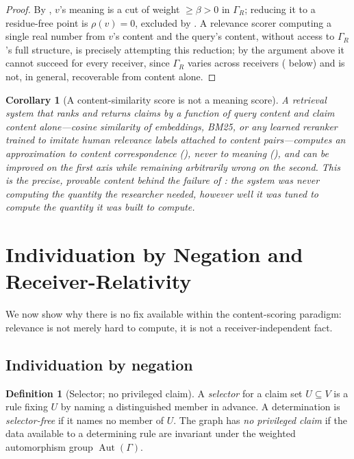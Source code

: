 \documentclass[11pt,twocolumn,a4paper]{article}
\theoremstyle{frathm}
\newtheorem{corollary}[theorem]{Corollary}
\theoremstyle{definition}
\newtheorem{definition}[theorem]{Definition}
\theoremstyle{remark}
\newcommand{\Gph}{\Gamma}
\newcommand{\V}{V}
\newcommand{\flo}{\beta}
\newcommand{\res}{\rho}
\DeclareMathOperator{\Aut}{Aut}
\begin{document}
\begin{proof}
By , $v$'s meaning is a cut of weight $\ge\flo>0$ in
$\Gph_R$; reducing it to a residue-free point is $\res(v)=0$, excluded by
. A relevance scorer computing a single real
number from $v$'s content and the query's content, without access to
$\Gph_R$'s full structure, is precisely attempting this reduction; by the
argument above it cannot succeed for every receiver, since $\Gph_R$
varies across receivers ( below) and is not, in
general, recoverable from content alone.
\end{proof}

\begin{corollary}[A content-similarity score is not a meaning score]
\label{cor:not-meaning-score}
A retrieval system that ranks and returns claims by a function of query
content and claim content alone---cosine similarity of embeddings, BM25,
or any learned reranker trained to imitate human relevance labels
attached to content pairs---computes an approximation to content
correspondence (), never to meaning
(), and can be improved on the first axis while
remaining arbitrarily wrong on the second. This is the precise, provable
content behind the failure of : the system was never
computing the quantity the researcher needed, however well it was tuned
to compute the quantity it was built to compute.
\end{corollary}

\section{Individuation by Negation and Receiver-Relativity}
\label{sec:individuation}

We now show why there is no fix available within the content-scoring
paradigm: relevance is not merely hard to compute, it is not a
receiver-independent fact.

\subsection{Individuation by negation}

\begin{definition}[Selector; no privileged claim]
\label{def:selector}
A \emph{selector} for a claim set $U\subseteq\V$ is a rule fixing $U$ by
naming a distinguished member in advance. A determination is
\emph{selector-free} if it names no member of $U$. The graph has
\emph{no privileged claim} if the data available to a determining rule
are invariant under the weighted automorphism group $\Aut(\Gph)$.
\end{definition}
\end{document}
